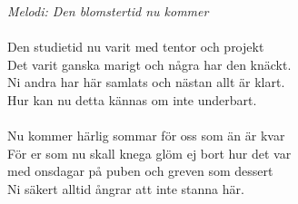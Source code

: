 {\footnotesize\textit{Melodi: Den blomstertid nu kommer}}\\
\\
Den studietid nu varit med tentor och projekt\\
Det varit ganska marigt och några har den knäckt.\\
Ni andra har här samlats och nästan allt är klart.\\
Hur kan nu detta kännas om inte underbart.\\
\\
Nu kommer härlig sommar för oss som än är kvar\\
För er som nu skall knega glöm ej bort hur det var\\
med onsdagar på puben och greven som dessert\\
Ni säkert alltid ångrar att inte stanna här.
